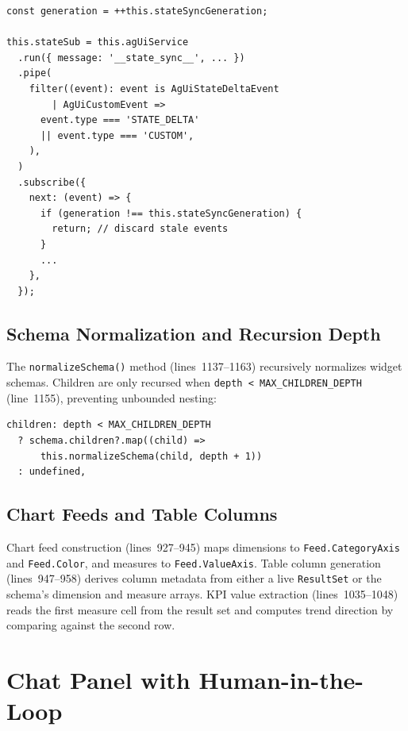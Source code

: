 \documentclass[11pt]{article}
\begin{document}
\begin{lstlisting}[language={[Sharp]C},caption={Stale-request guard (sac-ai-data-widget.component.ts:761--778)}]
const generation = ++this.stateSyncGeneration;

this.stateSub = this.agUiService
  .run({ message: '__state_sync__', ... })
  .pipe(
    filter((event): event is AgUiStateDeltaEvent
        | AgUiCustomEvent =>
      event.type === 'STATE_DELTA'
      || event.type === 'CUSTOM',
    ),
  )
  .subscribe({
    next: (event) => {
      if (generation !== this.stateSyncGeneration) {
        return; // discard stale events
      }
      ...
    },
  });
\end{lstlisting}

\subsection{Schema Normalization and Recursion Depth}

The \texttt{normalizeSchema()} method (lines~1137--1163) recursively normalizes
widget schemas. Children are only recursed when \texttt{depth < MAX\_CHILDREN\_DEPTH}
(line~1155), preventing unbounded nesting:

\begin{lstlisting}[language={[Sharp]C},caption={Depth-bounded normalization (sac-ai-data-widget.component.ts:1155--1157)}]
children: depth < MAX_CHILDREN_DEPTH
  ? schema.children?.map((child) =>
      this.normalizeSchema(child, depth + 1))
  : undefined,
\end{lstlisting}

\subsection{Chart Feeds and Table Columns}

Chart feed construction (lines~927--945) maps dimensions to
\texttt{Feed.CategoryAxis} and \texttt{Feed.Color}, and measures to
\texttt{Feed.ValueAxis}. Table column generation (lines~947--958) derives
column metadata from either a live \texttt{ResultSet} or the schema's dimension
and measure arrays. KPI value extraction (lines~1035--1048) reads the first
measure cell from the result set and computes trend direction by comparing
against the second row.

\section{Chat Panel with Human-in-the-Loop}
\label{sec:chat}
\end{document}
